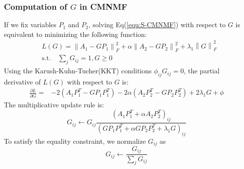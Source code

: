\documentclass{bmcart}
\begin{document}
\subsubsection*{Computation of $G$ in CMNMF}
If we fix variables $P_1$ and $P_2$, solving Eq(\ref{equ:S-CMNMF}) with respect to $G$ is equivalent to minimizing the following function:
\begin{equation}\label{obj:obj_G}\nonumber
\begin{split}
&L(G)=\left\| {{A_1} - GP_1} \right\|_F^2 + \alpha \left\| {{A_2} - G{P_2}} \right\|_F^2 
     +{\lambda _1}\left\| G \right\|_F^2\\
     &\mathrm{s.t. }\quad \sum_jG_{ij}=1,G\ge 0
\end{split}
\end{equation}
Using the Karush-Kuhn-Tucher(KKT) conditions $\phi_{ij}G_{ij}=0$, the partial derivative of $L(G)$ with respect to $G$ is:
\begin{equation}\label{equ:G_gradient}\nonumber
\begin{split}
\frac{\partial{L}}{\partial{G}}=
&-2(A_1{P_1^T} - G{P_1}{P_1^T})-2\alpha(A_2{P_2^T} - G{P_2}{P_2^T})+2\lambda_1G+\phi
\end{split}
\end{equation}
The multiplicative update rule is:
\begin{equation}\label{equ:updating_G}\nonumber
G_{ij}\leftarrow G_{ij}
\frac{(A_1P_1^T+\alpha A_2P_2^T)_{ij}}
{(GP_1P_1^T+\alpha GP_2P_2^T+\lambda_1G)_{ij}}
\end{equation}
To satisfy the equality constraint, we normalize $G_{ij}$ as
\begin{equation}\label{equ:updating_G}\nonumber
G_{ij}\leftarrow \frac{G_{ij}}{\sum_{j}G_{ij}}
\end{equation}

\end{document}
